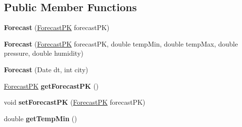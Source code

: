 \subsection*{Public Member Functions}
\begin{DoxyCompactItemize}
\item 
\hypertarget{classit_1_1polimi_1_1se_1_1calcare_1_1entities_1_1Forecast_a9374b07d11df110bfe7376069217aed0}{}{\bfseries Forecast} (\hyperlink{classit_1_1polimi_1_1se_1_1calcare_1_1entities_1_1ForecastPK}{Forecast\+P\+K} forecast\+P\+K)\label{classit_1_1polimi_1_1se_1_1calcare_1_1entities_1_1Forecast_a9374b07d11df110bfe7376069217aed0}

\item 
\hypertarget{classit_1_1polimi_1_1se_1_1calcare_1_1entities_1_1Forecast_aed435f4ab688311e516a532595f33bc1}{}{\bfseries Forecast} (\hyperlink{classit_1_1polimi_1_1se_1_1calcare_1_1entities_1_1ForecastPK}{Forecast\+P\+K} forecast\+P\+K, double temp\+Min, double temp\+Max, double pressure, double humidity)\label{classit_1_1polimi_1_1se_1_1calcare_1_1entities_1_1Forecast_aed435f4ab688311e516a532595f33bc1}

\item 
\hypertarget{classit_1_1polimi_1_1se_1_1calcare_1_1entities_1_1Forecast_a14ba5435d7bf1ed8b770649911da7b76}{}{\bfseries Forecast} (Date dt, int city)\label{classit_1_1polimi_1_1se_1_1calcare_1_1entities_1_1Forecast_a14ba5435d7bf1ed8b770649911da7b76}

\item 
\hypertarget{classit_1_1polimi_1_1se_1_1calcare_1_1entities_1_1Forecast_a4523ab646ac8b0684abb5427fa4521e9}{}\hyperlink{classit_1_1polimi_1_1se_1_1calcare_1_1entities_1_1ForecastPK}{Forecast\+P\+K} {\bfseries get\+Forecast\+P\+K} ()\label{classit_1_1polimi_1_1se_1_1calcare_1_1entities_1_1Forecast_a4523ab646ac8b0684abb5427fa4521e9}

\item 
\hypertarget{classit_1_1polimi_1_1se_1_1calcare_1_1entities_1_1Forecast_a3646c4b684d5ef0f13108325eda98819}{}void {\bfseries set\+Forecast\+P\+K} (\hyperlink{classit_1_1polimi_1_1se_1_1calcare_1_1entities_1_1ForecastPK}{Forecast\+P\+K} forecast\+P\+K)\label{classit_1_1polimi_1_1se_1_1calcare_1_1entities_1_1Forecast_a3646c4b684d5ef0f13108325eda98819}

\item 
\hypertarget{classit_1_1polimi_1_1se_1_1calcare_1_1entities_1_1Forecast_ab3908583bf2bf774d6b346cf244533b1}{}double {\bfseries get\+Temp\+Min} ()\label{classit_1_1polimi_1_1se_1_1calcare_1_1entities_1_1Forecast_ab3908583bf2bf774d6b346cf244533b1}


\end{DoxyCompactItemize}
